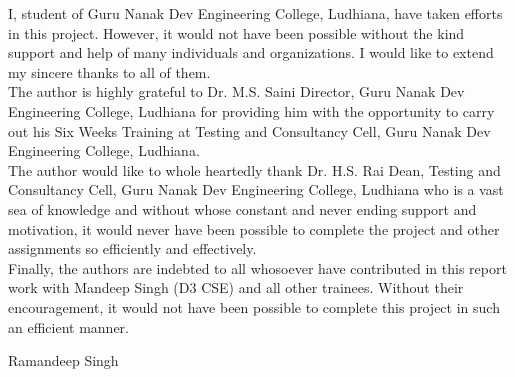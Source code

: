 \begin{Large}
\end{Large}
I, student of Guru Nanak Dev Engineering College, Ludhiana, have taken efforts in this project.
However, it would not have been possible without the kind support and help of many individuals
and organizations. I would like to extend my sincere thanks to all of them.\\

\noindent The author is highly grateful to Dr. M.S. Saini Director, Guru Nanak Dev Engineering College, Ludhiana for providing him with the opportunity to carry out his Six Weeks Training at Testing and Consultancy Cell, Guru Nanak Dev Engineering College, Ludhiana.\\

\noindent The author would like to whole heartedly thank Dr. H.S. Rai Dean, Testing and Consultancy
Cell, Guru Nanak Dev Engineering College, Ludhiana who is a vast sea of knowledge and without whose constant and never ending support and motivation, it would never have been possible to complete the project and other assignments so efficiently and effectively.\\

\noindent Finally, the authors are indebted to all whosoever have contributed in
this report work with Mandeep Singh (D3 CSE) and all other trainees. Without their 
encouragement, it would not have been possible to complete this project
in such an efficient manner.




\vskip 1.0cm 
\noindent Ramandeep Singh
